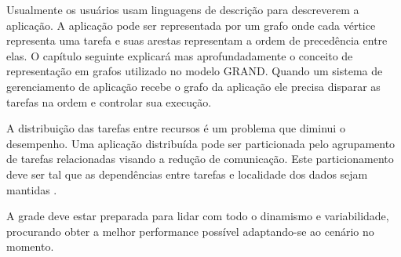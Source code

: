 Usualmente os usuários usam linguagens de descrição para descreverem a aplicação. A aplicação pode ser representada por um grafo onde cada vértice representa uma tarefa e suas arestas representam a ordem de precedência entre elas. O capítulo seguinte explicará mas aprofundadamente o conceito de representação em grafos utilizado no modelo GRAND. Quando um sistema de gerenciamento de aplicação recebe o grafo da aplicação ele precisa disparar as tarefas na ordem e controlar sua execução. 

A distribuição das tarefas entre recursos é um problema que diminui o desempenho. Uma aplicação distribuída pode ser particionada pelo agrupamento de tarefas relacionadas visando a redução de comunicação. Este particionamento deve ser tal que as dependências entre tarefas e localidade dos dados sejam mantidas \cite{Mangan2006}. 

A grade deve estar preparada para lidar com todo o dinamismo e variabilidade, procurando obter a melhor performance possível adaptando-se ao cenário no momento.


